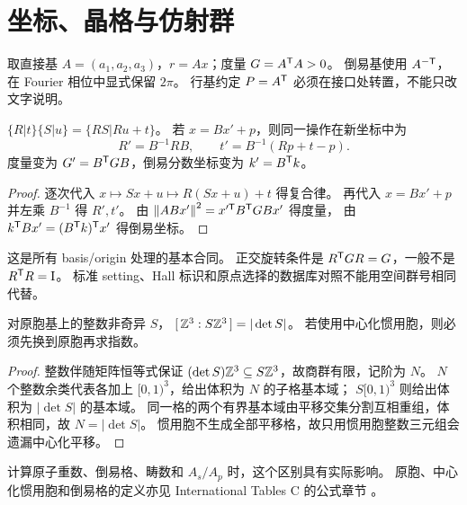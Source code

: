 \section{坐标、晶格与仿射群}\label{sec:affine}
取直接基 $A=(a_1,a_2,a_3)$，$r=Ax$；度量 $G=A^\mathsf T A>0$。
倒易基使用 $A^{-\mathsf T}$，在 Fourier 相位中显式保留 $2\pi$。
行基约定 $P=A^\mathsf T$ 必须在接口处转置，不能只改文字说明。

\begin{proposition}[仿射复合与换基]\label{prop:affine}
$\{R|t\}\{S|u\}=\{RS|Ru+t\}$。
若 $x=Bx'+p$，则同一操作在新坐标中为
\[
 R'=B^{-1}RB,\qquad t'=B^{-1}(Rp+t-p).
\]
度量变为 $G'=B^\mathsf T GB$，倒易分数坐标变为 $k'=B^\mathsf T k$。
\end{proposition}
\begin{proof}
逐次代入 $x\mapsto Sx+u\mapsto R(Sx+u)+t$ 得复合律。
再代入 $x=Bx'+p$ 并左乘 $B^{-1}$ 得 $R',t'$。
由 $\norm{ABx'}^2=x'^\T B^\T GBx'$ 得度量，
由 $k^\mathsf T Bx'=(B^\mathsf T k)^\mathsf T x'$ 得倒易坐标。
\end{proof}
这是所有 basis/origin 处理的基本合同\citep{Hatch1985,ITA}。
正交旋转条件是 $R^\mathsf T GR=G$，一般不是 $R^\mathsf T R=\mathrm I$。
标准 setting、Hall 标识和原点选择的数据库对照不能用空间群号相同代替。

\begin{proposition}[超胞指数与中心化]
对原胞基上的整数非奇异 $S$，
$[\,\mathbb Z^3:S\mathbb Z^3\,]=|\det S|$。
若使用中心化惯用胞，则必须先换到原胞再求指数。
\end{proposition}
\begin{proof}
整数伴随矩阵恒等式保证 $(\det S)\mathbb Z^3\subseteq S\mathbb Z^3$，故商群有限，记阶为 $N$。
$N$ 个整数余类代表各加上 $[0,1)^3$，给出体积为 $N$ 的子格基本域；
$S[0,1)^3$ 则给出体积为 $|\det S|$ 的基本域。
同一格的两个有界基本域由平移交集分割互相重组，体积相同，故 $N=|\det S|$。
惯用胞不生成全部平移格，故只用惯用胞整数三元组会遗漏中心化平移。
\end{proof}
计算原子重数、倒易格、畴数和 $A_s/A_p$ 时，这个区别具有实际影响。
原胞、中心化惯用胞和倒易格的定义亦见 International Tables C 的公式章节
\citep{ITCGeometry}。

